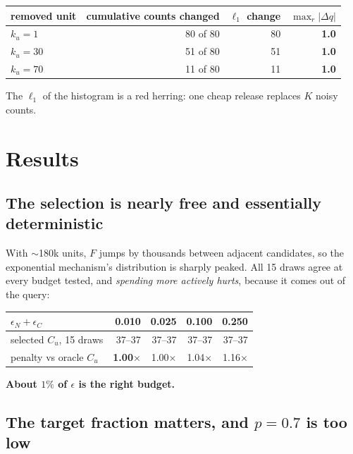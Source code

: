 \documentclass[11pt,a4paper]{article}
\newcommand{\Cu}{C_u}
\newcommand{\ku}{k_u}
\begin{document}
\begin{center}\small
\begin{tabular}{lrrr}
\toprule
removed unit & cumulative counts changed & $\ell_1$ change & $\max_r |\Delta q|$ \\
\midrule
$\ku = 1$  & 80 of 80 & 80 & \textbf{1.0} \\
$\ku = 30$ & 51 of 80 & 51 & \textbf{1.0} \\
$\ku = 70$ & 11 of 80 & 11 & \textbf{1.0} \\
\bottomrule
\end{tabular}
\end{center}

The $\ell_1$ of the histogram is a red herring: one cheap release replaces $K$ noisy counts.

\section{Results}

\subsection{The selection is nearly free and essentially deterministic}

With $\sim$180k units, $F$ jumps by thousands between adjacent candidates, so the exponential
mechanism's distribution is sharply peaked. All 15 draws agree at every budget tested, and
\emph{spending more actively hurts}, because it comes out of the query:

\begin{center}\small
\begin{tabular}{lrrrr}
\toprule
$\epsilon_N + \epsilon_C$ & 0.010 & 0.025 & 0.100 & 0.250 \\
\midrule
selected $\Cu$, 15 draws & 37--37 & 37--37 & 37--37 & 37--37 \\
penalty vs oracle $\Cu$ & \textbf{1.00$\times$} & 1.00$\times$ & 1.04$\times$ & 1.16$\times$ \\
\bottomrule
\end{tabular}
\end{center}

\textbf{About $1\%$ of $\epsilon$ is the right budget.}

\subsection{The target fraction matters, and $p = 0.7$ is too low}\label{sec:asym}
\end{document}
